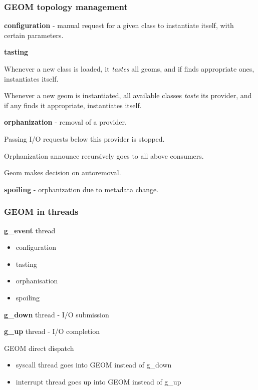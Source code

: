 \documentclass{beamer}
\begin{document}
\begin{frame}
\frametitle{GEOM topology management}
\begin{itemize}
  \item {
    \textbf{configuration} - manual request for a given class to instantiate
    itself, with certain parameters.
  }
 {
  \item {
    \textbf{tasting}
    \begin{itemize}
       \item { Whenever a new class is loaded, it \emph{tastes} all
               geoms, and if finds appropriate ones, instantiates itself. }
 {
       \item { Whenever a new geom is instantiated, all available classes
               \emph{taste} its provider, and if any finds it appropriate,
               instantiates itself. }
}
    \end{itemize}
  }
}
 {
  \item {
    \textbf{orphanization} - removal of a provider.
    \begin{itemize}
 {
      \item { Passing I/O requests below this provider is stopped. }
}
 {
      \item { Orphanization announce recursively goes to all above consumers. }
}
 {
      \item { Geom makes decision on autoremoval. }
}
    \end{itemize}
  }
}
 {
  \item {
    \textbf{spoiling} - orphanization due to metadata change.
  }
}
\end{itemize}
\end{frame}


\begin{frame}
\frametitle{GEOM in threads}
\begin{itemize}
 {
  \item {
    \textbf{g\_event} thread
    \begin{itemize}
      \item { configuration }
      \item { tasting }
      \item { orphanisation }
      \item { spoiling }
    \end{itemize}
  }
}
 {
  \item { \textbf{g\_down} thread - I/O submission }
  \item { \textbf{g\_up} thread - I/O completion }
}
 {
  \item { GEOM direct dispatch }
    \begin{itemize}
      \item { syscall thread goes into GEOM instead of g\_down }
      \item { interrupt thread goes up into GEOM instead of g\_up }
    \end{itemize}
}
\end{itemize}
\end{frame}
\end{document}
